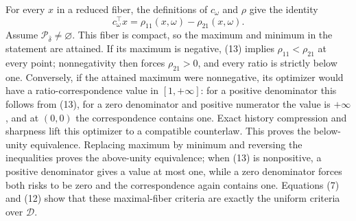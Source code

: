 For every \(x\) in a reduced fiber, the definitions of \(c_\omega\) and \(\rho\) give the identity
\[
 c_\omega^{\top}x
 =\rho_{11}(x,\omega)-\rho_{21}(x,\omega).
\tag{13}
\]
Assume \(\mathcal P_{\bar\delta}\neq\varnothing\).  This fiber is compact, so the maximum and minimum in the statement are attained.  If its maximum is negative, (13) implies \(\rho_{11}<\rho_{21}\) at every point; nonnegativity then forces \(\rho_{21}>0\), and every ratio is strictly below one.  Conversely, if the attained maximum were nonnegative, its optimizer would have a ratio-correspondence value in \([1,+\infty]\): for a positive denominator this follows from (13), for a zero denominator and positive numerator the value is \(+\infty\), and at \((0,0)\) the correspondence contains one.  Exact history compression and sharpness lift this optimizer to a compatible counterlaw.  This proves the below-unity equivalence.  Replacing maximum by minimum and reversing the inequalities proves the above-unity equivalence; when (13) is nonpositive, a positive denominator gives a value at most one, while a zero denominator forces both risks to be zero and the correspondence again contains one.  Equations (7) and (12) show that these maximal-fiber criteria are exactly the uniform criteria over \(\mathcal D\).

